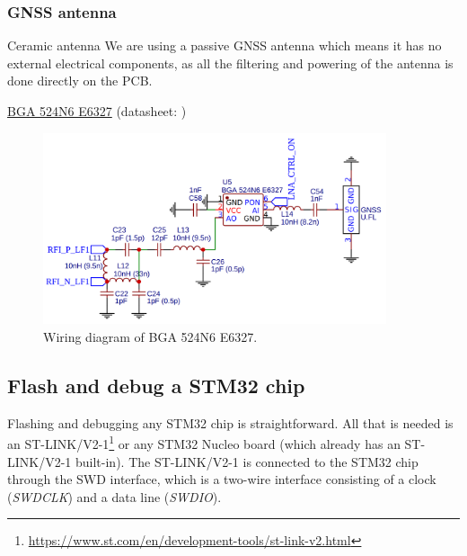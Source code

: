 \subsubsection{GNSS antenna}
Ceramic antenna
We are using a passive \ac{GNSS} antenna which means it has no external electrical components, as all the filtering and powering of the antenna is done directly on the \ac{PCB}.

\hyperref[bom:bga524n6e6327]{BGA 524N6 E6327} (datasheet: )

\begin{figure}[H]
    \centering
    \includegraphics[width=0.9\textwidth]{figures/BGA524N6E6327.png}
    \caption{Wiring diagram of BGA 524N6 E6327.}
    \label{fig:schematic:bga524n6e6327}
\end{figure}

\subsection{Flash and debug a STM32 chip} \label{sec:flash_debug_stm32}
Flashing and debugging any STM32 chip is straightforward. All that is needed is an ST-LINK/V2-1\footnote{\url{https://www.st.com/en/development-tools/st-link-v2.html}} or any STM32 Nucleo board (which already has an ST-LINK/V2-1 built-in). The ST-LINK/V2-1 is connected to the STM32 chip through the \ac{SWD} interface, which is a two-wire interface consisting of a clock (\textit{SWDCLK}) and a data line (\textit{SWDIO}). 

